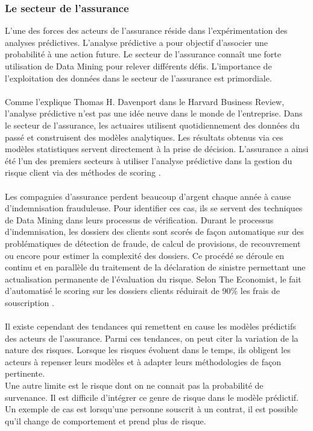 \documentclass[11pt,a4paper]{report}
\begin{document}
  \subsubsection{Le secteur de l'assurance}
 L'une des forces des acteurs de l'assurance 
 réside dans l'expérimentation des analyses prédictives. L'analyse prédictive a pour objectif d'associer une probabilité à une action future. 
  Le secteur de l'assurance connaît  une forte utilisation de Data Mining pour relever différents défis. L'importance de l'exploitation des données dans le secteur de l'assurance est primordiale. \\\\
  Comme l’explique Thomas H. Davenport \cite{thomas} dans le Harvard Business Review, l’analyse prédictive n’est pas une idée neuve dans le monde de l’entreprise. Dans le secteur de l’assurance, les actuaires utilisent quotidiennement des données du passé et construisent des modèles analytiques. Les résultats obtenus via ces modèles statistiques servent directement à la prise de décision. L’assurance a ainsi été l'un des premiers secteurs à utiliser l’analyse prédictive dans la gestion du risque client via des méthodes de scoring \cite{Benjamin}.\\\\
  Les compagnies d'assurance perdent beaucoup d'argent chaque année à cause d'indemnisation frauduleuse. Pour identifier ces cas, ils se servent des techniques de Data Mining dans leurs processus de vérification. Durant le processus d'indemnisation, les dossiers des clients sont scorés de façon automatique sur des problématiques de détection de fraude, de calcul de provisions, de recouvrement ou encore pour estimer la complexité des dossiers. Ce procédé se déroule en continu et en parallèle du traitement de la déclaration de sinistre permettant une actualisation permanente de l’évaluation du risque. Selon The Economist, le fait d'automatisé le scoring sur les dossiers clients réduirait de 90\% les frais de souscription \cite{assurance_fraude}.\\\\ 
 Il existe cependant des tendances qui remettent en cause les modèles prédictifs des acteurs de l'assurance. Parmi ces tendances, on peut citer la variation de la nature des risques. Lorsque les risques évoluent dans le temps, ils obligent les acteurs à repenser leurs modèles et à adapter leurs méthodologies de façon pertinente.\\  Une autre limite est le risque dont on ne connait pas la probabilité de survenance. Il est difficile d'intégrer ce genre de risque dans le modèle prédictif. Un exemple de cas est lorsqu'une personne souscrit à un contrat, il est possible qu'il change de comportement et prend plus de risque.  
 
\end{document}
